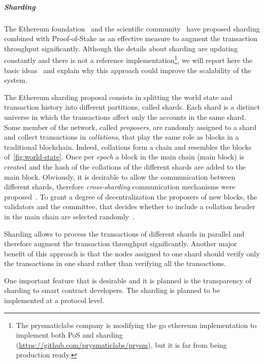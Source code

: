 \subparagraph{Sharding}
The Ethereum foundation~\cite{bib:mauve, bib:sharding-faq} and the scientific
community~\cite{bib:scaling-croman} have proposed sharding combined with
Proof-of-Stake as an effective measure to augment the transaction throughput
significantly.
Although the details about sharding are updating constantly and there is not a
reference implementation\footnote{The prysmaticlabs company is modifying the go
ethereum implementation to implement both PoS and sharding
(\url{https://github.com/prysmaticlabs/prysm}), but it is far from being
production ready.}, we will report here the basic
ideas~\cite{bib:mauve,bib:sharding-faq} and explain why this approach could
improve the scalability of the system.

The Ethereum sharding proposal consists in splitting the world state and
transaction history into different partitions, called shards.
Each shard is a distinct universe in which the transactions affect only the
accounts in the same shard. Some member of the network, called \emph{proposers},
are randomly assigned to a shard  and collect transactions in
\emph{collations}, that play the same role as blocks in a traditional
blockchain. Indeed, collations form a chain and resembles the blocks
of~\autoref{fig:world-state}. Once per \emph{epoch} a block in the main chain
(main block) is created and the hash of the collations of the different shards
are added to the main block. %
Obviously, it is desirable to allow the communication between different shards,
therefore \emph{cross-sharding} communication mechanisms were
proposed~\cite{bib:sharding-faq}. To grant a degree of decentralization the
proposers of new blocks, the validators and the committee, that decides whether
to include a collation header in the main chain are selected randomly~\cite{}.

Sharding allows to process the transactions of different shards in parallel
and therefore augment the transaction throughput significantly. Another major
benefit of this approach is that the nodes assigned to one shard should verify
only the transactions in one shard rather than verifying all the transactions.


One important feature that is desirable and it is planned is the transparency
of sharding to smart contract developers. The sharding is planned to be
implemented at a protocol level.



